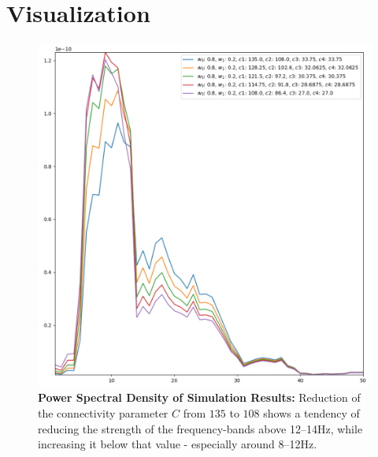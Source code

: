 \section{Visualization}\label{sec:visualization}

\begin{figure}[H]
\includegraphics[width=14cm]{Figures/temp_sim_results}
\caption{\textbf{Power Spectral Density of Simulation Results:} Reduction of the connectivity parameter $C$
    from $135$ to $108$ shows a tendency of reducing the strength of the frequency-bands above 12--14Hz,
    while increasing it below that value - especially around 8--12Hz.}
\label{fig:sim_results1}
\end{figure}

